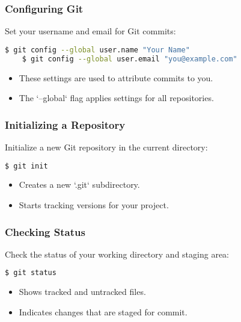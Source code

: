 \begin{frame}[fragile]
	\frametitle{Configuring Git}
	Set your username and email for Git commits:
	\begin{lstlisting}[language=bash]
	$ git config --global user.name "Your Name"
	$ git config --global user.email "you@example.com"
	\end{lstlisting}
	\begin{itemize}
		\item These settings are used to attribute commits to you.
		\item The `--global` flag applies settings for all repositories.
	\end{itemize}
\end{frame}


\begin{frame}[fragile]
	\frametitle{Initializing a Repository}
	Initialize a new Git repository in the current directory:
	\begin{lstlisting}[language=bash]
	$ git init
	\end{lstlisting}
	\begin{itemize}
		\item Creates a new `.git` subdirectory.
		\item Starts tracking versions for your project.
	\end{itemize}
\end{frame}

\begin{frame}[fragile]
	\frametitle{Checking Status}
	Check the status of your working directory and staging area:
	\begin{lstlisting}[language=bash]
	$ git status
	\end{lstlisting}
	\begin{itemize}
		\item Shows tracked and untracked files.
		\item Indicates changes that are staged for commit.
	\end{itemize}
\end{frame}

